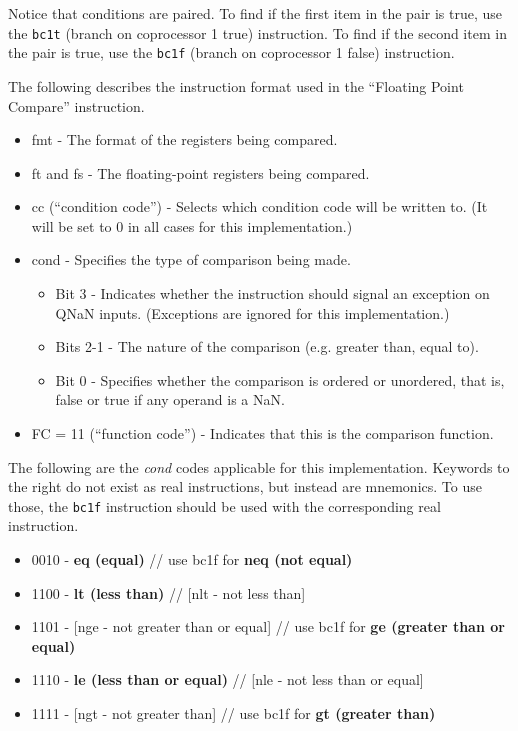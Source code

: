 \documentclass[
    paper=letter,
    parskip=half,
    fontsize=12pt,
    titlepage=firstiscover,
    toc=bibliography,
    numbers=endperiod
]{scrartcl}
\providecommand{\tightlist}{%
  \setlength{\itemsep}{0pt}\setlength{\parskip}{0pt}}
\begin{document}
Notice that conditions are paired. To find if the first item in the pair
is true, use the \texttt{bc1t} (branch on coprocessor 1 true)
instruction. To find if the second item in the pair is true, use the
\texttt{bc1f} (branch on coprocessor 1 false) instruction.

The following describes the instruction format used in the ``Floating
Point Compare'' instruction.

\begin{itemize}
    \tightlist
    \item fmt - The format of the registers being compared.
    \item ft and fs - The floating-point registers being compared.
    \item cc (``condition code'') - Selects which condition code will be written
          to. (It will be set to 0 in all cases for this implementation.)
    \item cond - Specifies the type of comparison being made.
          \begin{itemize}
              \tightlist
              \item Bit 3 - Indicates whether the instruction should signal an exception on
                    QNaN inputs. (Exceptions are ignored for this implementation.)
              \item Bits 2-1 - The nature of the comparison (e.g. greater than, equal to).
              \item Bit 0 - Specifies whether the comparison is ordered or unordered, that
                    is, false or true if any operand is a NaN.
          \end{itemize}
    \item FC = 11 (``function code'') - Indicates that this is the comparison
          function.
\end{itemize}

The following are the \emph{cond} codes applicable for this
implementation. Keywords to the right do not exist as real instructions,
but instead are mnemonics. To use those, the \texttt{bc1f} instruction
should be used with the corresponding real instruction.

\begin{itemize}
    \tightlist
    \item 0010 - \textbf{eq (equal)} // use bc1f for \textbf{neq (not equal)}
    \item 1100 - \textbf{lt (less than)} // [nlt - not less than]
    \item 1101 - [nge - not greater than or equal] // use bc1f for \textbf{ge (greater than or equal)}
    \item 1110 - \textbf{le (less than or equal)} // [nle - not less than or equal]
    \item 1111 - [ngt - not greater than] // use bc1f for \textbf{gt (greater than)}
\end{itemize}
\end{document}
